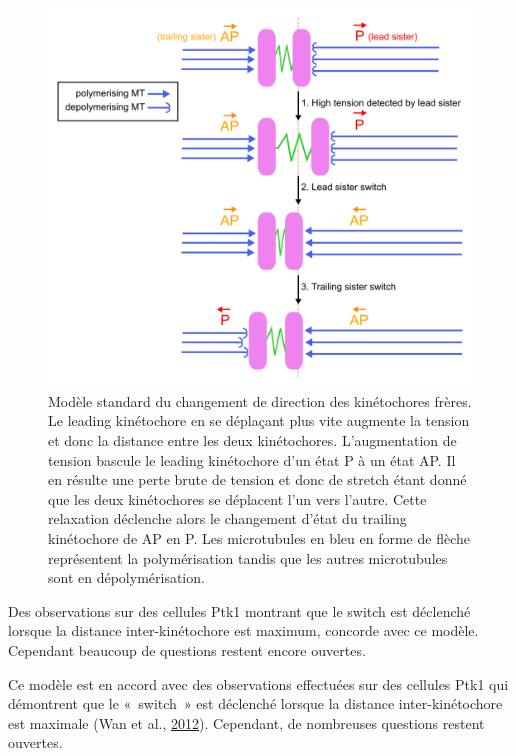 \documentclass[12pt,a4paper,twoside,openright]{book}
\begin{document}
\begin{figure}[htbp]
\centering
\includegraphics{figures/intro/run_switch.png}
\caption[Modèle standard du changement de direction des kinétochores frères.]{\label{fig:run-switch}Modèle
standard du changement de direction des kinétochores frères. Le leading
kinétochore en se déplaçant plus vite augmente la tension et donc la
distance entre les deux kinétochores. L'augmentation de tension bascule
le leading kinétochore d'un état P à un état AP. Il en résulte une perte
brute de tension et donc de stretch étant donné que les deux
kinétochores se déplacent l'un vers l'autre. Cette relaxation déclenche
alors le changement d'état du trailing kinétochore de AP en P. Les
microtubules en bleu en forme de flèche représentent la polymérisation
tandis que les autres microtubules sont en dépolymérisation.}
\end{figure}

Des observations sur des cellules Ptk1 montrant que le switch est
déclenché lorsque la distance inter-kinétochore est maximum, concorde
avec ce modèle. Cependant beaucoup de questions restent encore ouvertes.

Ce modèle est en accord avec des observations effectuées sur des
cellules Ptk1 qui démontrent que le «~switch~» est déclenché lorsque la
distance inter-kinétochore est maximale (Wan et al.,
\protect\hyperlink{ref-Wan2012}{2012}). Cependant, de nombreuses
questions restent ouvertes.
\end{document}
